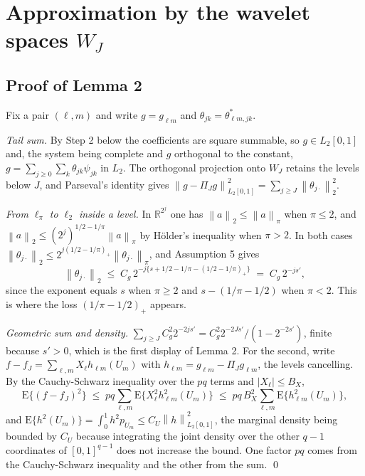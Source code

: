 \documentclass[10pt]{book}
\theoremstyle{definition}
\newcommand{\R}{\mathbb{R}}
\newcommand{\E}{\mathrm{E}}
\newcommand{\norm}[1]{\left\lVert #1 \right\rVert}
\newcommand{\cv}{\ell}
\newcommand{\md}{m}
\newcommand{\lev}{j}
\newcommand{\tsl}{k}
\newcommand{\gcomp}[2]{g_{#1#2}}
\newcommand{\wav}[2]{\psi_{#1#2}}
\newcommand{\WJ}{W_{J}}
\newcommand{\PiJ}{\Pi_{J}}
\newcommand{\coefs}[4]{\theta^{*}_{#1#2,#3#4}}
\newcommand{\seff}{s'}
\begin{document}
\section[\texorpdfstring{Approximation by the wavelet spaces $\WJ$}{Approximation by the wavelet spaces W\_J}]{Approximation by the wavelet \texorpdfstring{\textcolor{colR1}{spaces $\WJ$}}{spaces W\_J}}
\setcounter{equation}{0}

\subsection*{Proof of Lemma 2}

Fix a pair $(\cv,\md)$ and write $g = \gcomp{\cv}{\md}$ and
$\theta_{\lev\tsl} = \coefs{\cv}{\md}{\lev}{\tsl}$.

\emph{Tail sum.} By Step 2 below the coefficients are square summable, so
$g \in L_2[0,1]$ and, the system being complete and $g$ orthogonal to the
constant, $g = \sum_{\lev\ge0}\sum_{\tsl}\theta_{\lev\tsl}\wav{\lev}{\tsl}$ in
$L_2$. The orthogonal projection onto $\WJ$ retains the levels below $J$, and
Parseval's identity gives
$\norm{g-\PiJ g}^2_{L_2[0,1]} = \sum_{\lev\ge J}
\norm{\theta_{\lev\cdot}}_2^2$.

\emph{From $\ell_\pi$ to $\ell_2$ inside a level.} In $\R^{2^{\lev}}$ one has
$\norm{a}_2 \le \norm{a}_{\pi}$ when $\pi \le 2$, and
$\norm{a}_2 \le (2^{\lev})^{1/2-1/\pi}\norm{a}_{\pi}$ by Hölder's inequality
when $\pi > 2$. In both cases $\norm{\theta_{\lev\cdot}}_2 \le
2^{\lev(1/2-1/\pi)_{+}}\norm{\theta_{\lev\cdot}}_{\pi}$, and
Assumption 5 gives
\[
  \norm{\theta_{\lev\cdot}}_2 \;\le\;
  C_g\,2^{-\lev\{s+1/2-1/\pi-(1/2-1/\pi)_{+}\}}
  \;=\; C_g\,2^{-\lev\seff},
\]
since the exponent equals $s$ when $\pi \ge 2$ and $s-(1/\pi-1/2)$ when
$\pi < 2$. This is where the loss $(1/\pi-1/2)_{+}$ appears.

\emph{Geometric sum and density.}
$\sum_{\lev\ge J}C_g^2 2^{-2\lev\seff} = C_g^2 2^{-2J\seff}/(1-2^{-2\seff})$,
finite because $\seff > 0$, which is the first display of Lemma 2. For the
second, write $f-f_J = \sum_{\cv,\md}X_{\cv}h_{\cv\md}(U_{\md})$ with
$h_{\cv\md} = \gcomp{\cv}{\md}-\PiJ\gcomp{\cv}{\md}$, the levels cancelling.
By the Cauchy-Schwarz inequality over the $pq$ terms and
$|X_{\cv}| \le B_X$,
\[
  \E\{(f-f_J)^2\} \;\le\; pq\sum_{\cv,\md}
  \E\{X_{\cv}^2h_{\cv\md}^2(U_{\md})\}
  \;\le\; pq\,B_X^2\sum_{\cv,\md}\E\{h_{\cv\md}^2(U_{\md})\},
\]
and $\E\{h^2(U_{\md})\} = \int_0^1 h^2 p_{U_{\md}} \le C_U\norm{h}^2_{L_2[0,1]}$,
the marginal density being bounded by $C_U$ because integrating the joint
density over the other $q-1$ coordinates of $[0,1]^{q-1}$ does not increase
the bound. One factor $pq$ comes from the Cauchy-Schwarz inequality and the
other from the sum. \qed
\end{document}
